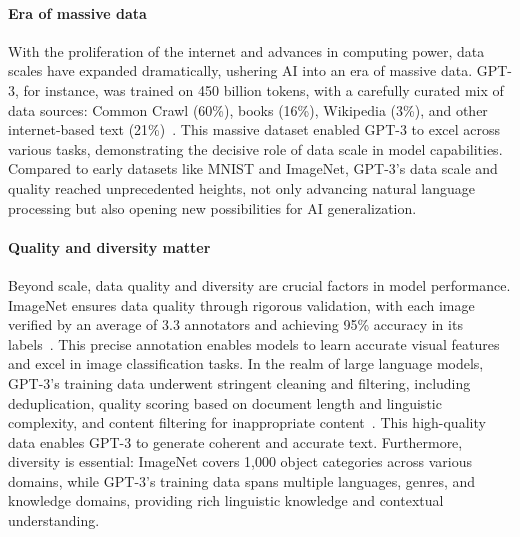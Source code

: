 \paragraph{Era of massive data}
With the proliferation of the internet and advances in computing power, data scales have expanded dramatically, ushering AI into an era of massive data. GPT-3, for instance, was trained on 450 billion tokens, with a carefully curated mix of data sources: Common Crawl (60\%), books (16\%), Wikipedia (3\%), and other internet-based text (21\%)~\cite{brown2020language}. This massive dataset enabled GPT-3 to excel across various tasks, demonstrating the decisive role of data scale in model capabilities. Compared to early datasets like MNIST and ImageNet, GPT-3's data scale and quality reached unprecedented heights, not only advancing natural language processing but also opening new possibilities for AI generalization.

\paragraph{Quality and diversity matter}
Beyond scale, data quality and diversity are crucial factors in model performance. ImageNet ensures data quality through rigorous validation, with each image verified by an average of 3.3 annotators and achieving 95\% accuracy in its labels~\cite{deng2009imagenet}. This precise annotation enables models to learn accurate visual features and excel in image classification tasks. In the realm of large language models, GPT-3's training data underwent stringent cleaning and filtering, including deduplication, quality scoring based on document length and linguistic complexity, and content filtering for inappropriate content~\cite{brown2020language}. This high-quality data enables GPT-3 to generate coherent and accurate text. Furthermore, diversity is essential: ImageNet covers 1,000 object categories across various domains, while GPT-3's training data spans multiple languages, genres, and knowledge domains, providing rich linguistic knowledge and contextual understanding.

